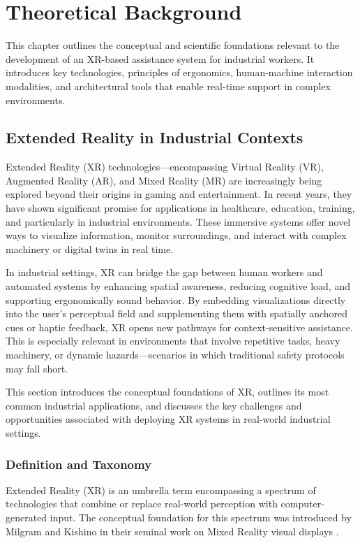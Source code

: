 \chapter{Theoretical Background}
\label{chap:theoretical_background}

This chapter outlines the conceptual and scientific foundations relevant to the development of an XR-based assistance system for industrial workers. It introduces key technologies, principles of ergonomics, human-machine interaction modalities, and architectural tools that enable real-time support in complex environments.

\section{Extended Reality in Industrial Contexts}

Extended Reality (XR) technologies—encompassing Virtual Reality (VR), Augmented Reality (AR), and Mixed Reality (MR) are increasingly being explored beyond their origins in gaming and entertainment. In recent years, they have shown significant promise for applications in healthcare, education, training, and particularly in industrial environments. These immersive systems offer novel ways to visualize information, monitor surroundings, and interact with complex machinery or digital twins in real time.

In industrial settings, XR can bridge the gap between human workers and automated systems by enhancing spatial awareness, reducing cognitive load, and supporting ergonomically sound behavior. By embedding visualizations directly into the user's perceptual field and supplementing them with spatially anchored cues or haptic feedback, XR opens new pathways for context-sensitive assistance. This is especially relevant in environments that involve repetitive tasks, heavy machinery, or dynamic hazards—scenarios in which traditional safety protocols may fall short.

This section introduces the conceptual foundations of XR, outlines its most common industrial applications, and discusses the key challenges and opportunities associated with deploying XR systems in real-world industrial settings.

\subsection{Definition and Taxonomy}

Extended Reality (XR) is an umbrella term encompassing a spectrum of technologies that combine or replace real-world perception with computer-generated input. The conceptual foundation for this spectrum was introduced by Milgram and Kishino in their seminal work on Mixed Reality visual displays \cite{milgram1994taxonomy}.

